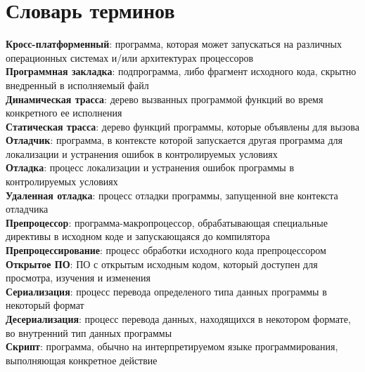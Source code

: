 \chapter*{Словарь терминов}             %

\textbf{Кросс-платформенный}: программа, которая может запускаться на различных операционных системах и/или архитектурах процессоров            \\
\textbf{Программная закладка}: подпрограмма, либо фрагмент исходного кода, скрытно внедренный в исполняемый файл                                 \\
\textbf{Динамическая трасса}: дерево вызванных программой функций во время конкретного ее исполнения                                            \\
\textbf{Статическая трасса}: дерево функций программы, которые объявлены для вызова                                                            \\
\textbf{Отладчик}: программа, в контексте которой запускается другая программа для локализации и устранения ошибок
в контролируемых условиях \\
\textbf{Отладка}: процесс локализации и устранения ошибок программы в контролируемых условиях                                       \\
\textbf{Удаленная отладка}: процесс отладки программы, запущенной вне контекста отладчика                                                     \\
\textbf{Препроцессор}: программа-макропроцессор, обрабатывающая специальные директивы в исходном коде и запускающаяся до компилятора     \\
\textbf{Препроцессирование}: процесс обработки исходного кода препроцессором                                                                   \\
\textbf{Открытое ПО}: ПО с открытым исходным кодом, который доступен для просмотра, изучения и изменения                                \\
\textbf{Сериализация}: процесс перевода определеного типа данных программы в некоторый формат                                            \\
\textbf{Десериализация}: процесс перевода данных, находящихся в некотором формате, во внутренний тип данных программы                      \\
\textbf{Скрипт}: программа, обычно на интерпретируемом языке программирования, выполняющая конкретное действие                     \\
